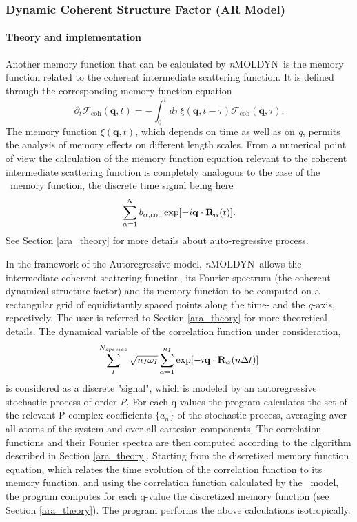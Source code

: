 \documentclass[a4paper,11pt]{report}
\newcommand{\qval}{\textit{q}}
\newcommand{\NMOLDYN}{\textit{n}MOLDYN}
\begin{document}
\subsubsection{Dynamic Coherent Structure Factor (AR Model)}
\label{dcsfar}
\paragraph{Theory and implementation\\}
\label{dcsfar_theory}
Another memory function that can be calculated by \NMOLDYN\ is the memory function related to the coherent intermediate 
scattering function. It is defined through the corresponding memory function equation
\begin{equation}
\label{eq:mem_fcoh}
\partial_t{\mathcal{F}} _{\mathrm{coh}}(\mathbf{q},t) =
-\int_{0}^{t} d\tau\,\xi(\mathbf{q},t-\tau){\mathcal{F} _{\mathrm{coh}}}(\mathbf{q},\tau) \mbox{.}
\end{equation}
The memory function $\xi(\mathbf{q},t)$, which depends on time as well as on \qval, permits the analysis of memory effects on 
different length scales. From a numerical point of view the calculation of the memory function equation relevant to the coherent 
intermediate scattering function is completely analogous to the case of the \VACF\ memory function, the discrete
time signal being here
\begin{equation}
\sum_{\alpha=1}^N b_{\alpha,\mathrm{coh}}\exp[-i{\bf q}\cdot{\bf R}_\alpha(t)].
\end{equation}
See Section \ref{ara_theory} for more details about auto-regressive process.

In the framework of the Autoregressive model, \NMOLDYN\ allows the intermediate coherent scattering function, its Fourier 
spectrum (the coherent dynamical structure factor) and its memory function to be computed on a rectangular grid of 
equidistantly spaced points along the time- and the \qval-axis, repectively. The user is referred to Section 
\ref{ara_theory} for more theoretical details. The dynamical variable of the correlation function under consideration, 
\begin{equation}
\label{eq:dcsfar_rho}
\sum^{N_{species}}_I \sqrt{n_I \omega_I} \sum^{n_I}_{\alpha=1} \exp[-i{\bf q}\cdot{\bf R}_\alpha(n\Delta t)]
\end{equation}
is considered as a discrete "signal", which is modeled by an autoregressive stochastic process of order \textit{P}. For each 
q-values the program calculates the set of the relevant P complex coefficients $\{a_n\}$ of the stochastic process, 
averaging aver all atoms of the system and over all cartesian components. The correlation functions and their Fourier 
spectra are then computed according to the algorithm described in Section \ref{ara_theory}.
Starting from the discretized memory function equation, which relates the time evolution of the correlation function to its 
memory function, and using the correlation function calculated by the \AR\ model, the program computes for each q-value the 
discretized memory function (see Section \ref{ara_theory}).
The program performs the above calculations isotropically.
\newpage
\end{document}
